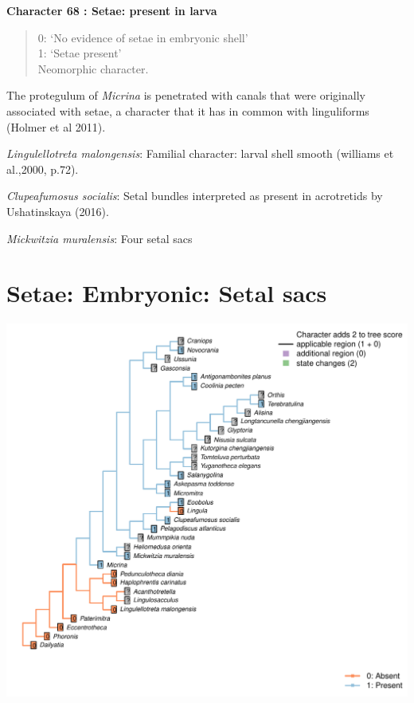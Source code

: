 \documentclass[]{book}
\theoremstyle{definition}
\theoremstyle{definition}
\theoremstyle{definition}
\theoremstyle{remark}
\begin{document}
\textbf{Character 68 : Setae: present in larva }

\begin{quote}
0: `No evidence of setae in embryonic shell'\\
1: `Setae present'\\
Neomorphic character.
\end{quote}

The protegulum of \emph{Micrina} is penetrated with canals that were
originally associated with setae, a character that it has in common with
linguliforms (Holmer et al 2011).

\emph{Lingulellotreta malongensis}: Familial character: larval shell
smooth (williams et al.,2000, p.72).

\emph{Clupeafumosus socialis}: Setal bundles interpreted as present in
acrotretids by Ushatinskaya (2016).

\emph{Mickwitzia muralensis}: Four setal sacs

\hypertarget{setae-embryonic-setal-sacs}{%
\section*{Setae: Embryonic: Setal
sacs}\label{setae-embryonic-setal-sacs}}

\includegraphics{Brachiopod_phylogeny_files/figure-latex/unnamed-chunk-5-69.pdf}
\end{document}
